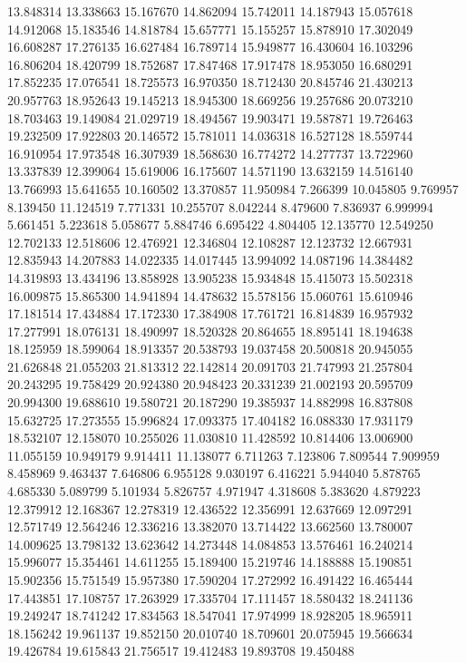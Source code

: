 13.848314
13.338663
15.167670
14.862094
15.742011
14.187943
15.057618
14.912068
15.183546
14.818784
15.657771
15.155257
15.878910
17.302049
16.608287
17.276135
16.627484
16.789714
15.949877
16.430604
16.103296
16.806204
18.420799
18.752687
17.847468
17.917478
18.953050
16.680291
17.852235
17.076541
18.725573
16.970350
18.712430
20.845746
21.430213
20.957763
18.952643
19.145213
18.945300
18.669256
19.257686
20.073210
18.703463
19.149084
21.029719
18.494567
19.903471
19.587871
19.726463
19.232509
17.922803
20.146572
15.781011
14.036318
16.527128
18.559744
16.910954
17.973548
16.307939
18.568630
16.774272
14.277737
13.722960
13.337839
12.399064
15.619006
16.175607
14.571190
13.632159
14.516140
13.766993
15.641655
10.160502
13.370857
11.950984
7.266399
10.045805
9.769957
8.139450
11.124519
7.771331
10.255707
8.042244
8.479600
7.836937
6.999994
5.661451
5.223618
5.058677
5.884746
6.695422
4.804405
12.135770
12.549250
12.702133
12.518606
12.476921
12.346804
12.108287
12.123732
12.667931
12.835943
14.207883
14.022335
14.017445
13.994092
14.087196
14.384482
14.319893
13.434196
13.858928
13.905238
15.934848
15.415073
15.502318
16.009875
15.865300
14.941894
14.478632
15.578156
15.060761
15.610946
17.181514
17.434884
17.172330
17.384908
17.761721
16.814839
16.957932
17.277991
18.076131
18.490997
18.520328
20.864655
18.895141
18.194638
18.125959
18.599064
18.913357
20.538793
19.037458
20.500818
20.945055
21.626848
21.055203
21.813312
22.142814
20.091703
21.747993
21.257804
20.243295
19.758429
20.924380
20.948423
20.331239
21.002193
20.595709
20.994300
19.688610
19.580721
20.187290
19.385937
14.882998
16.837808
15.632725
17.273555
15.996824
17.093375
17.404182
16.088330
17.931179
18.532107
12.158070
10.255026
11.030810
11.428592
10.814406
13.006900
11.055159
10.949179
9.914411
11.138077
6.711263
7.123806
7.809544
7.909959
8.458969
9.463437
7.646806
6.955128
9.030197
6.416221
5.944040
5.878765
4.685330
5.089799
5.101934
5.826757
4.971947
4.318608
5.383620
4.879223
12.379912
12.168367
12.278319
12.436522
12.356991
12.637669
12.097291
12.571749
12.564246
12.336216
13.382070
13.714422
13.662560
13.780007
14.009625
13.798132
13.623642
14.273448
14.084853
13.576461
16.240214
15.996077
15.354461
14.611255
15.189400
15.219746
14.188888
15.190851
15.902356
15.751549
15.957380
17.590204
17.272992
16.491422
16.465444
17.443851
17.108757
17.263929
17.335704
17.111457
18.580432
18.241136
19.249247
18.741242
17.834563
18.547041
17.974999
18.928205
18.965911
18.156242
19.961137
19.852150
20.010740
18.709601
20.075945
19.566634
19.426784
19.615843
21.756517
19.412483
19.893708
19.450488
